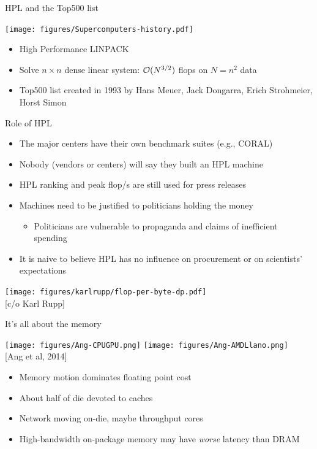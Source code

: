 \documentclass{beamer}
\begin{document}
\begin{frame}{HPL and the Top500 list}
  \begin{center}
    \texttt{[image: figures/Supercomputers-history.pdf]}
  \end{center}
  \begin{itemize}
  \item High Performance LINPACK
  \item Solve $n\times n$ dense linear system: $\mathcal{O}(N^{3/2})$ flops on $N=n^2$ data
  \item Top500 list created in 1993 by Hans Meuer, Jack Dongarra, Erich
    Strohmeier, Horst Simon
  \end{itemize}
\end{frame}

\begin{frame}{Role of HPL}
  \begin{itemize}
  \item The major centers have their own benchmark suites (e.g., CORAL)
  \item Nobody (vendors or centers) will say they built an HPL machine
  \item HPL ranking and peak flop/s are still used for press releases
  \item Machines need to be justified to politicians holding the money
    \begin{itemize}
    \item Politicians are vulnerable to propaganda and claims of inefficient spending
    \end{itemize}
  \item It is naive to believe HPL has no influence on procurement or on scientists' expectations
  \end{itemize}
\end{frame}

\begin{frame}
  \texttt{[image: figures/karlrupp/flop-per-byte-dp.pdf]} \\
  {\scriptsize [c/o Karl Rupp]}
\end{frame}

\begin{frame}{It's all about the memory}
  \begin{center}
    \texttt{[image: figures/Ang-CPUGPU.png]}
    \texttt{[image: figures/Ang-AMDLlano.png]} \\
    {\scriptsize [Ang et al, 2014]}
  \end{center}
  \begin{itemize}
  \item Memory motion dominates floating point cost
  \item About half of die devoted to caches
  \item Network moving on-die, maybe throughput cores
  \item High-bandwidth on-package memory may have \emph{worse} latency than DRAM
  \end{itemize}
\end{frame}
\end{document}
